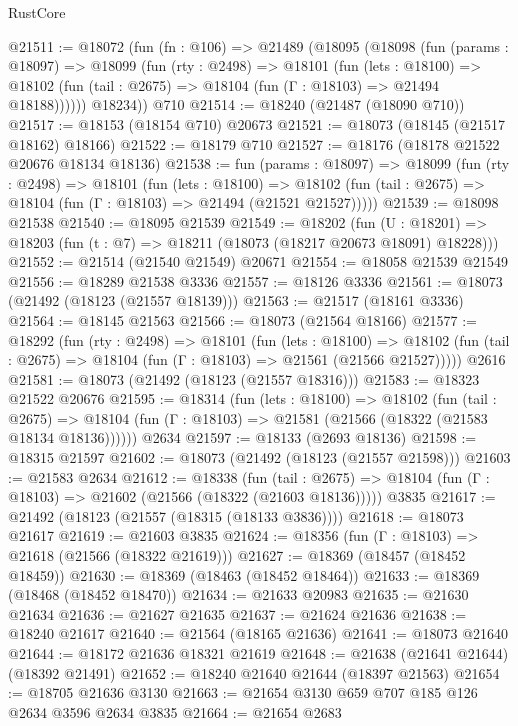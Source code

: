 \begin{lexlean}{RustCore}
\begin{coremodule}
@21511 := @18072
    (fun (fn : @106) =>
    @21489
      (@18095
        (@18098
          (fun (params : @18097) =>
          @18099
            (fun (rty : @2498) =>
            @18101
              (fun (lets : @18100) =>
              @18102 (fun (tail : @2675) => @18104 (fun (Γ : @18103) => @21494 @18188))))))
        @18234))
    @710
@21514 := @18240 (@21487 (@18090 @710))
@21517 := @18153 (@18154 @710) @20673
@21521 := @18073 (@18145 (@21517 @18162) @18166)
@21522 := @18179 @710
@21527 := @18176 (@18178 @21522 @20676 @18134 @18136)
@21538 := fun (params : @18097) =>
  @18099
    (fun (rty : @2498) =>
    @18101
      (fun (lets : @18100) =>
      @18102 (fun (tail : @2675) => @18104 (fun (Γ : @18103) => @21494 (@21521 @21527)))))
@21539 := @18098 @21538
@21540 := @18095 @21539
@21549 := @18202
    (fun (U : @18201) => @18203 (fun (t : @7) => @18211 (@18073 (@18217 @20673 @18091) @18228)))
@21552 := @21514 (@21540 @21549) @20671
@21554 := @18058 @21539 @21549
@21556 := @18289 @21538 @3336
@21557 := @18126 @3336
@21561 := @18073 (@21492 (@18123 (@21557 @18139)))
@21563 := @21517 (@18161 @3336)
@21564 := @18145 @21563
@21566 := @18073 (@21564 @18166)
@21577 := @18292
    (fun (rty : @2498) =>
    @18101
      (fun (lets : @18100) =>
      @18102 (fun (tail : @2675) => @18104 (fun (Γ : @18103) => @21561 (@21566 @21527)))))
    @2616
@21581 := @18073 (@21492 (@18123 (@21557 @18316)))
@21583 := @18323 @21522 @20676
@21595 := @18314
    (fun (lets : @18100) =>
    @18102
      (fun (tail : @2675) =>
      @18104 (fun (Γ : @18103) => @21581 (@21566 (@18322 (@21583 @18134 @18136))))))
    @2634
@21597 := @18133 (@2693 @18136)
@21598 := @18315 @21597
@21602 := @18073 (@21492 (@18123 (@21557 @21598)))
@21603 := @21583 @2634
@21612 := @18338
    (fun (tail : @2675) => @18104 (fun (Γ : @18103) => @21602 (@21566 (@18322 (@21603 @18136)))))
    @3835
@21617 := @21492 (@18123 (@21557 (@18315 (@18133 @3836))))
@21618 := @18073 @21617
@21619 := @21603 @3835
@21624 := @18356 (fun (Γ : @18103) => @21618 (@21566 (@18322 @21619)))
@21627 := @18369 (@18457 (@18452 @18459))
@21630 := @18369 (@18463 (@18452 @18464))
@21633 := @18369 (@18468 (@18452 @18470))
@21634 := @21633 @20983
@21635 := @21630 @21634
@21636 := @21627 @21635
@21637 := @21624 @21636
@21638 := @18240 @21617
@21640 := @21564 (@18165 @21636)
@21641 := @18073 @21640
@21644 := @18172 @21636 @18321 @21619
@21648 := @21638 (@21641 @21644) (@18392 @21491)
@21652 := @18240 @21640 @21644 (@18397 @21563)
@21654 := @18705 @21636 @3130
@21663 := @21654 @3130 @659 @707 @185 @126 @2634 @3596 @2634 @3835
@21664 := @21654 @2683

\end{coremodule}
\end{lexlean}
